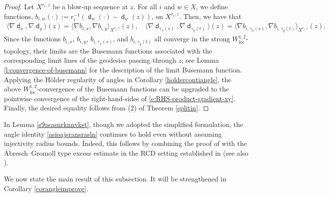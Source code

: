 \documentclass[11pt,reqno]{amsart}
\theoremstyle{definition}
\numberwithin{equation}{section}
\DeclareMathOperator{\dist}{\mathsf{d}}
\DeclareMathOperator{\loc}{loc}
\begin{document}
\begin{proof}  
Let $X^{r_i, z}$ be a blow-up sequence at $z$. For all $i$ and $w \in X$, we define functions, $b_{i, w}(\cdot) := r_i^{-1} (   \dist_w (\cdot) -  \dist_w (z))$, on $X^{r_i, z}$.
Then, we have that 
\begin{align}\label{e:RHS-product-gradient-xy}
\langle \nabla \dist_x, \nabla \dist_y\rangle (z) = \langle \nabla b_{i, x}, \nabla b_{i, y}\rangle_{X^{r_i, z}} (z),\quad  \langle \nabla \dist_{\gamma_x(s)}, \nabla \dist_{\gamma_y(t)}\rangle(z) =  \langle \nabla b_{i, \gamma_x(s)} ,  \nabla b_{i, \gamma_y(t)} \rangle_{X^{r_i, z}} (z).
\end{align} 
Since the functions $b_{i,x}$, $b_{i, y}$, $b_{i, \gamma_x(s)}$, and $b_{i, \gamma_y(t)}$ all converge in the strong   
$W^{1,2}_{\loc}$-topology, their limits are the Busemann functions associated with the corresponding limit lines of the   geodesics passing through $z$; see 
  Lemma \ref{l:convergence-of-busemann} for the description of the limit Busemann function.
Applying the H\"older regularity of angles in Corollary \ref{holdercontiangle}, the above $W_{\loc}^{1,2}$-convergence of the Busemann functions can be upgraded to the pointwise convergence
of the right-hand-sides of \eqref{e:RHS-product-gradient-xy}. 
Finally, the desired equality follows from (2) of Theorem \ref{splitin}.
 \end{proof}
In Lemma \ref{s9asasnrknnvkst}, though we adopted the simplified formulation, the angle identity \eqref{asioajsransrasln} continues to hold even without assuming injectivity radius bounds. 
Indeed, this follows by combining  the proof of  \cite[Theorem 4.4]{Honda1} with the Abresch–Gromoll type excess estimate in the RCD setting established in \cite[Theorem 3.7]{MN} (see also \cite[Theorem 2.15]{MW}).    


 

We now state the main result of this subsection. It will be strengthened in Corollary \ref{corangleimprove}. 
\end{document}
